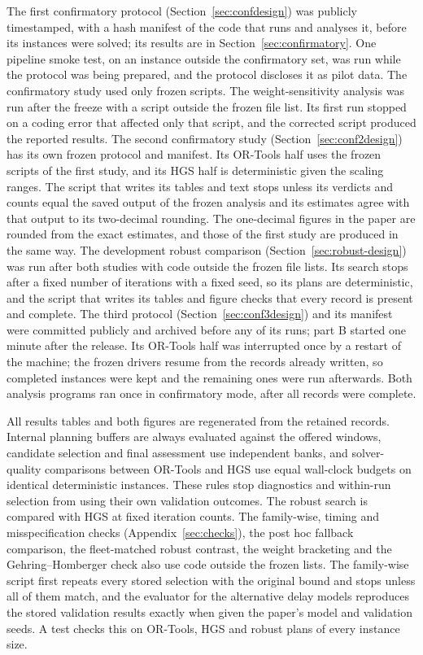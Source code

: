 \documentclass[11pt,a4paper]{article}
\begin{document}
The first confirmatory protocol (Section~\ref{sec:confdesign}) was publicly
timestamped, with a hash manifest of the code that runs and analyses it, before
its instances were solved; its results are in Section~\ref{sec:confirmatory}. One
pipeline smoke test, on an instance outside the confirmatory set, was run while
the protocol was being prepared, and the protocol discloses it as pilot data. The
confirmatory study used only frozen scripts. The weight-sensitivity analysis was
run after the freeze with a script outside the frozen file list. Its first run
stopped on a coding error that affected only that script, and the corrected
script produced the reported results. The second confirmatory study
(Section~\ref{sec:conf2design}) has its own frozen protocol and manifest. Its
OR-Tools half uses the frozen scripts of the first study, and its HGS half is
deterministic given the scaling ranges. The script that writes its tables and
text stops unless its verdicts and counts equal the saved output of the frozen
analysis and its estimates agree with that output to its two-decimal rounding.
The one-decimal figures in the paper are rounded from the exact estimates, and
those of the first study are produced in the same way. The development robust comparison (Section~\ref{sec:robust-design}) was run after
both studies with code outside the frozen file lists. Its search stops after a
fixed number of iterations with a fixed seed, so its plans are deterministic, and
the script that writes its tables and figure checks that every record is present
and complete. The third protocol (Section~\ref{sec:conf3design}) and its manifest
were committed publicly and archived \cite{ali2026freeze3} before any of its
runs; part B started one minute after the release. Its OR-Tools half was
interrupted once by a restart of the machine; the frozen drivers resume from the
records already written, so completed instances were kept and the remaining ones
were run afterwards. Both analysis programs ran once in confirmatory mode, after
all records were complete.

All results tables and both figures are regenerated from the retained records. Internal
planning buffers are always evaluated against the offered windows, candidate
selection and final assessment use independent banks, and solver-quality
comparisons between OR-Tools and HGS use equal wall-clock budgets on identical
deterministic instances. These rules stop diagnostics and within-run selection
from using their own validation outcomes. The robust search is compared with HGS
at fixed iteration counts. The family-wise, timing and misspecification checks
(Appendix~\ref{sec:checks}), the post hoc fallback comparison, the fleet-matched
robust contrast, the weight bracketing and the Gehring--Homberger check also use
code outside the frozen lists. The family-wise script first repeats every stored selection with
the original bound and stops unless all of them match, and the evaluator for the
alternative delay models reproduces the stored validation results exactly when
given the paper's model and validation seeds. A test checks this on OR-Tools,
HGS and robust plans of every instance size.
\end{document}
